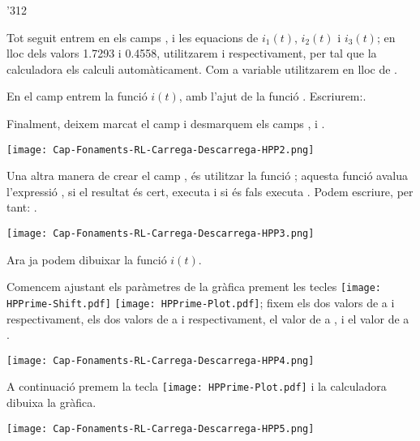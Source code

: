 \begin{exemple}
\begin{dingautolist}{'312}
        \item Tot seguit entrem en els camps ,  i  les equacions de $i_1(t)$, $i_2(t)$ i $i_3(t)$; en lloc dels valors \num{1,7293} i  \num{0,4558}, utilitzarem  i  respectivament, per tal que la calculadora els calculi automàticament. Com a variable utilitzarem  en lloc de .

            En el camp  entrem la funció $i(t)$, amb l'ajut de la funció  . Escriurem:\break {}.

            Finalment, deixem marcat el camp  i desmarquem els camps ,  i .

            \texttt{[image: Cap-Fonaments-RL-Carrega-Descarrega-HPP2.png]}

            Una altra manera de crear el camp , és utilitzar la funció ; aquesta funció avalua l'expressió , si el resultat   és cert, executa  i si és fals  executa . Podem escriure, per tant: .

            \texttt{[image: Cap-Fonaments-RL-Carrega-Descarrega-HPP3.png]}

        \item Ara ja podem dibuixar la funció $i(t)$.

            Comencem ajustant els paràmetres de la gràfica prement les tecles \texttt{[image: HPPrime-Shift.pdf]} \texttt{[image: HPPrime-Plot.pdf]}; fixem els dos valors de  a  i  respectivament, els dos valors de  a  i  respectivament, el valor de  a , i el valor de  a .

            \texttt{[image: Cap-Fonaments-RL-Carrega-Descarrega-HPP4.png]}

        \item A continuació premem la tecla \texttt{[image: HPPrime-Plot.pdf]} i la calculadora dibuixa la gràfica.

            \texttt{[image: Cap-Fonaments-RL-Carrega-Descarrega-HPP5.png]}
    \end{dingautolist}
\end{exemple}


